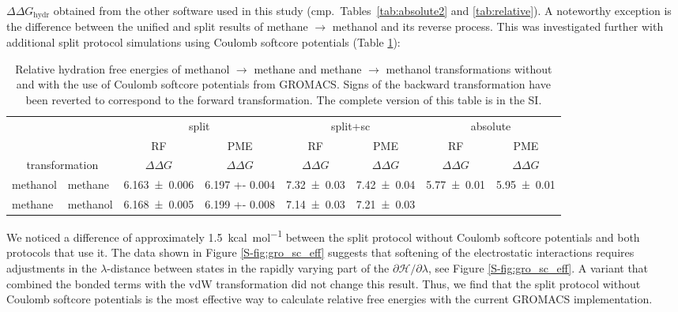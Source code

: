 \documentclass[journal=jctcce,manuscript=article]{achemso}
\begin{document}
$\Delta \Delta G_{\mathrm{hydr}}$ obtained from the other software used in this
study (cmp.\ Tables~\ref{tab:absolute2} and \ref{tab:relative}).  A noteworthy
exception is the difference between the unified and split results of methane
$\rightarrow$ methanol and its reverse process. This  was investigated further with
additional split protocol simulations using Coulomb softcore potentials (Table
\ref{tab:eff-sc}):

\begin{table}[]
\centering
\caption{Relative hydration free energies of methanol $\rightarrow$ methane and
methane $\rightarrow$ methanol transformations without and with the use of
Coulomb softcore potentials from GROMACS. Signs of the backward
transformation have been reverted to correspond to the forward transformation.
The complete version of this table is in the SI.}
\label{tab:eff-sc}
\begin{tabular}{@{}llclclcl@{}}
\toprule
 &  & \multicolumn{2}{c}{split} & \multicolumn{2}{c}{split+sc} &
 \multicolumn{2}{c}{absolute} \\
 &  & RF & \multicolumn{1}{c}{PME} & RF & \multicolumn{1}{c}{PME} & RF &
 \multicolumn{1}{c}{PME} \\
\multicolumn{2}{c}{transformation} & $\Delta \Delta G$ &
\multicolumn{1}{c}{$\Delta \Delta G$} & $\Delta \Delta G$ &
\multicolumn{1}{c}{$\Delta \Delta G$} & $\Delta \Delta G$ &
\multicolumn{1}{c}{$\Delta \Delta G$} \\ \midrule
methanol & methane & \multicolumn{1}{l}{\num{6.163 +- 0.006}} & \num{6.197 +-
0.004} & \multicolumn{1}{l}{\num{7.32+-0.03}} & \num{7.42+-0.04} &
\multicolumn{1}{l}{\num{5.77 +- 0.01}} & \num{5.95 +- 0.01} \\
methane & methanol & \multicolumn{1}{l}{\num{6.168 +- 0.005}} & \num{6.199 +-
0.008} & \multicolumn{1}{l}{\num{7.14+-0.03}} & \num{7.21+-0.03} &
\multicolumn{1}{l}{} &  \\ \bottomrule
\end{tabular}
\end{table}

We noticed a difference of approximately \SI{1.5}{kcal.mol^{-1}} between the
split protocol without Coulomb softcore potentials and both protocols that
use it. The data shown in Figure \ref{S-fig:gro_sc_eff}
suggests that softening of the
electrostatic interactions requires  adjustments in the $\lambda$-distance between
states in the rapidly varying part of the $\partial \mathcal{H}/\partial\lambda$, see
Figure \ref{S-fig:gro_sc_eff}.
A variant that combined the bonded terms with the vdW transformation did not change this result.  Thus, we find that the split protocol without Coulomb softcore potentials is the most effective way to calculate relative free energies with the current GROMACS implementation.
\end{document}
